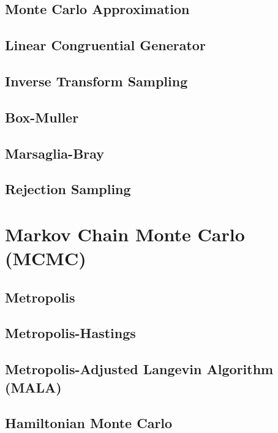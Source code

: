 \documentclass{article}
\begin{document}
\subsection{Monte Carlo Approximation}
\subsection{Linear Congruential Generator}
\subsection{Inverse Transform Sampling}
\subsection{Box-Muller}
\subsection{Marsaglia-Bray}
\subsection{Rejection Sampling}

\section{Markov Chain Monte Carlo (MCMC)}
\subsection{Metropolis}
\subsection{Metropolis-Hastings}
\subsection{Metropolis-Adjusted Langevin Algorithm (MALA)}
\subsection{Hamiltonian Monte Carlo}







% 
% 
\end{document}
